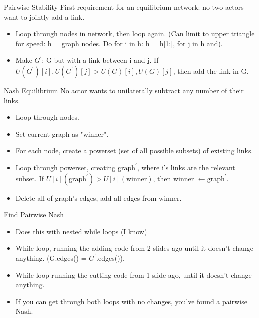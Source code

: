 \documentclass{beamer}
\begin{document}
\begin{frame}{Pairwise Stability}
First requirement for an equilibrium network: no two actors want to jointly add a link.
\begin{itemize}
\item Loop through nodes in network, then loop again. (Can limit to upper triangle for speed: h = graph nodes. Do for i in h: h = h[1:], for j in h and).
\item Make $G^{'}$: G but with a link between i and j. If $U(G^{'})[i],U(G^{'})[j]>U(G)[i], U(G)[j]$, then add the link in G. 
\end{itemize}
\end{frame}

\begin{frame}{Nash Equilibrium}
No actor wants to unilaterally subtract any number of their links.
\begin{itemize}
\item Loop through nodes.
\item Set current graph as "winner".
\item For each node, create a powerset (set of all possible subsets) of existing links.
\item Loop through powerset, creating $\text{graph}^{'}$, where i's links are the relevant subset. If $U[i](\text{graph}^{'}) >U[i](\text{winner})$, then winner $\leftarrow \text{graph}^{'}$.
\item Delete all of graph's edges, add all edges from winner.
\end{itemize}
\end{frame}

\begin{frame}{Find Pairwise Nash}
\begin{itemize}
\item Does this with nested while loops (I know)
\item While loop, running the adding code from 2 slides ago until it doesn't change anything. (G.edges() = $G^{'}$.edges()).
\item While loop  running the cutting code from 1 slide ago, until it doesn't change anything.
\item If you can get through both loops with no changes, you've found a pairwise Nash.
\end{itemize}
\end{frame}
\end{document}
